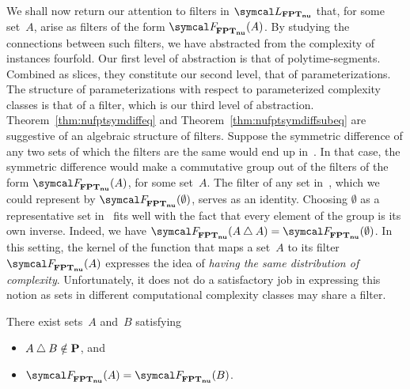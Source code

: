 We shall now return our attention to filters in $\calL_\clnu{FPT}$ that, for some set~$A$, arise as filters of the form $\calF_\clnu{FPT}(A)$.
By studying the connections between such filters, we have abstracted from the complexity of instances fourfold.
Our first level of abstraction is that of polytime-segments.
Combined as slices, they constitute our second level, that of parameterizations.
The structure of parameterizations with respect to parameterized complexity classes is that of a filter, which is our third level of abstraction.
Theorem~\ref{thm:nufptsymdiffeq} and Theorem~\ref{thm:nufptsymdiffsubeq} are suggestive of an algebraic structure of filters.
Suppose the symmetric difference of any two sets of which the filters are the same would end up in~.
In that case, the symmetric difference would make a commutative group out of the filters of the form $\calF_\clnu{FPT}(A)$, for some set~$A$.
The filter of any set in~, which we could represent by $\calF_\clnu{FPT}(\emptyset)$, serves as an identity.
Choosing $\emptyset$ as a representative set in~ fits well with the fact that every element of the group is its own inverse.
Indeed, we have $\calF_\clnu{FPT}(A \symdiff A) = \calF_\clnu{FPT}(\emptyset)$.
In this setting, the kernel of the function that maps a set~$A$ to its filter $\calF_\clnu{FPT}(A)$ expresses the idea of \emph{having the same distribution of complexity}.
Unfortunately, it does not do a satisfactory job in expressing this notion as sets in different computational complexity classes may share a filter.
\begin{theorem}
\label{thm:nufptsymdiff}%
  There exist sets~$A$ and~$B$ satisfying
  \begin{itemize}
  \item $A \bigtriangleup B \notin \textnormal{\textbf{P}}$, and
  \item $\calF_\clnu{FPT}(A) = \calF_\clnu{FPT}(B)$.
  \end{itemize}
\end{theorem}
